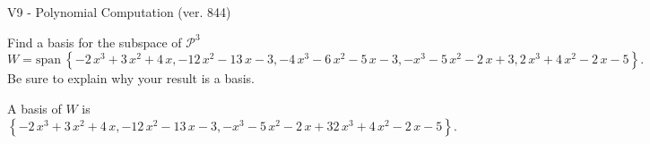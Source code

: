 \begin{exercise}
  \begin{exerciseTitle}V9 - Polynomial Computation (ver. 844)\end{exerciseTitle}
  \begin{exerciseStatement}
    Find a basis for the subspace of \(\mathcal{P}^3\) 
\[W=\mathrm{span}\ \left\{-2 \, x^{3} + 3 \, x^{2} + 4 \, x , -12 \, x^{2} - 13 \, x - 3 , -4 \, x^{3} - 6 \, x^{2} - 5 \, x - 3 , -x^{3} - 5 \, x^{2} - 2 \, x + 3 , 2 \, x^{3} + 4 \, x^{2} - 2 \, x - 5\right\}.\]
 Be sure to explain why your result is a basis.


  \end{exerciseStatement}
  \begin{exerciseAnswer}
   A basis of \(W\) is  \(\left\{-2 \, x^{3} + 3 \, x^{2} + 4 \, x , -12 \, x^{2} - 13 \, x - 3 , -x^{3} - 5 \, x^{2} - 2 \, x + 3 2 \, x^{3} + 4 \, x^{2} - 2 \, x - 5\right\}\).
  


  \end{exerciseAnswer}
\end{exercise}